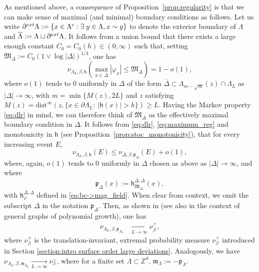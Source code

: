 \documentclass[11pt,a4paper]{article}
\theoremstyle{definition}
\numberwithin{equation}{section}
\begin{document}
As mentioned above, a consequence of Proposition~\ref{prop:regularity} is that we can make sense of maximal (and minimal) boundary conditions as follows. Let us write $\partial^{\rm ext}\Lambda := \{ x \in \Lambda^c: \exists \; y \in \Lambda, x \sim y \}$ to denote the exterior boundary of $\Lambda$ and $\overline \Lambda:= \Lambda \sqcup \partial^{\rm ext}\Lambda$.
It follows from a union bound that there exists a large enough constant $C_{0}=C_0(h)\in(0,\infty)$ such that, setting $\mathfrak{M}_\Delta:=C_{0} (1\vee\log |\Delta|)^{1/4}$, one has  
\begin{equation}\label{eq:maximum_reg}
    \nu_{\Lambda_L,\beta,\mathsf{h}} \left( \max_{x\in\overline \Delta} |\varphi_x| \leq \mathfrak{M}_\Delta \right) = 1-o(1),
\end{equation}
where $o(1)$ tends to $0$ uniformly in $\Delta$ of the form $\overline \Delta\subset \Lambda_{m-\sqrt{m}}(z)\cap\Lambda_L$ as $|\Delta|\rightarrow\infty$, with $m=\min\{M(z),2L\}$ and $z$ satisfying $M(z)=\mathrm{dist}^\infty(z,\{x\in \partial\Lambda_L:~|\mathsf{h}(x)|>h\})\geq L$. 
Having the Markov property \eqref{eq:dlr} in mind, we can therefore think of $\mathfrak{M}_\Delta$ as the effectively maximal boundary condition in $\Delta$.
It follows from \eqref{eq:dlr}, \eqref{eq:maximum_reg} and monotonicity in $\mathsf{h}$ (see Proposition~\ref{prop:stoc_monotonicity}), that for every increasing event $E$,
\begin{equation}
    \nu_{\Lambda_L,\beta,\mathsf{h}}(E)\leq \nu_{\Delta,\beta,\mathfrak{p}_\Delta}(E) + o(1),
\end{equation}
where, again, $o(1)$ tends to $0$ uniformly in $\Delta$ chosen as above as $|\Delta|\to\infty$, and where 
\begin{equation}
    \mathfrak{p}_{\Delta}(x):= \mathsf{h}^{\overline{\Delta},\Delta}_{\mathfrak M_\Delta}(x),
\end{equation}
with $\mathsf{h}_{\varphi}^{\overline{\Delta},\Delta}$ defined in \eqref{eq:bc->mag_field}.
When clear from context, we omit the subscript $\Delta$ in the notation $\mathfrak{p}_\Delta$.
Then, as shown in \cite{Ruelle1970,LebowitzPresutti1976} (see also \cite{GunaratnamPanagiotisPanisSeveroPhi42022} in the context of general graphs of polynomial growth), one has 
\begin{align}\label{eq:conv_plus}
\nu_{\Lambda_L,\beta,\mathfrak{p}_{\Lambda_L}}&\underset{L\to\infty}{\longrightarrow} \nu^+_\beta,
\end{align}
where $\nu^+_\beta$ is the translation-invariant, extremal probability measure $\nu^+_\beta$ introduced in Section \ref{section:intro surface order large deviations}. Analogously, we have $\nu_{\Lambda_L,\beta,\mathfrak{m}_{\Lambda_L}}\underset{L\to\infty}{\longrightarrow} \nu_\beta^-$, where for a finite set $\Lambda\subset \mathbb Z^d$,  $\mathfrak{m}_\Lambda:=-\mathfrak{p}_\Lambda$.
\end{document}
